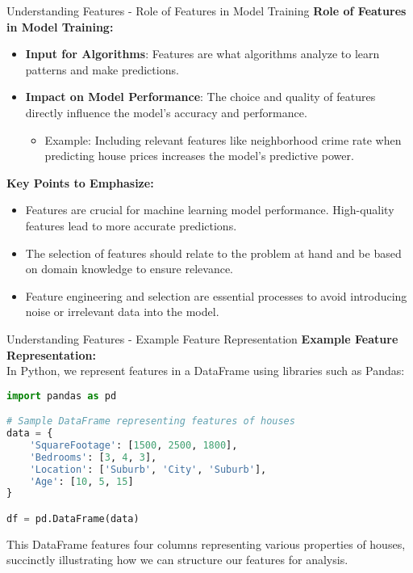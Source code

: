 \documentclass[aspectratio=169]{beamer}
\begin{document}
\begin{frame}[fragile]{Understanding Features - Role of Features in Model Training}
    \textbf{Role of Features in Model Training:}
    \begin{itemize}
        \item \textbf{Input for Algorithms}: Features are what algorithms analyze to learn patterns and make predictions. 
        \item \textbf{Impact on Model Performance}: The choice and quality of features directly influence the model's accuracy and performance. 
        \begin{itemize}
            \item Example: Including relevant features like neighborhood crime rate when predicting house prices increases the model's predictive power.
        \end{itemize}
    \end{itemize}

    \textbf{Key Points to Emphasize:}
    \begin{itemize}
        \item Features are crucial for machine learning model performance. High-quality features lead to more accurate predictions.
        \item The selection of features should relate to the problem at hand and be based on domain knowledge to ensure relevance.
        \item Feature engineering and selection are essential processes to avoid introducing noise or irrelevant data into the model.
    \end{itemize}
\end{frame}

\begin{frame}[fragile]{Understanding Features - Example Feature Representation}
    \textbf{Example Feature Representation:}\\
    In Python, we represent features in a DataFrame using libraries such as Pandas:
    
    \begin{lstlisting}[language=Python]
import pandas as pd

# Sample DataFrame representing features of houses
data = {
    'SquareFootage': [1500, 2500, 1800],
    'Bedrooms': [3, 4, 3],
    'Location': ['Suburb', 'City', 'Suburb'],
    'Age': [10, 5, 15]
}

df = pd.DataFrame(data)
    \end{lstlisting}
    
    This DataFrame features four columns representing various properties of houses, succinctly illustrating how we can structure our features for analysis.
\end{frame}
\end{document}
